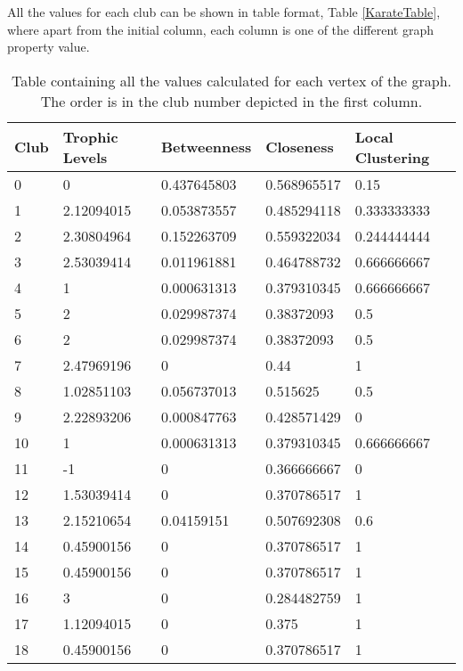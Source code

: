 All the values for each club can be shown in table format, Table \ref{KarateTable}, where apart from the initial column, each column is one of the different graph property value.

\begin{table}[H]
    \centering
    \small
    \caption{Table containing all the values calculated for each vertex of the graph. The order is in the club number depicted in the first column.}
    \begin{tabular}{|l|l|l|l|l|}
        \hline
        \textbf{Club} & \textbf{Trophic Levels} & \textbf{Betweenness} & \textbf{Closeness} & \textbf{Local Clustering} \\ \hline
        0 & 0 & 0.437645803 & 0.568965517 & 0.15 \\ \hline
        1 & 2.12094015 & 0.053873557 & 0.485294118 & 0.333333333 \\ \hline
        2 & 2.30804964 & 0.152263709 & 0.559322034 & 0.244444444 \\ \hline
        3 & 2.53039414 & 0.011961881 & 0.464788732 & 0.666666667 \\ \hline
        4 & 1 & 0.000631313 & 0.379310345 & 0.666666667 \\ \hline
        5 & 2 & 0.029987374 & 0.38372093 & 0.5 \\ \hline
        6 & 2 & 0.029987374 & 0.38372093 & 0.5 \\ \hline
        7 & 2.47969196 & 0 & 0.44 & 1 \\ \hline
        8 & 1.02851103 & 0.056737013 & 0.515625 & 0.5 \\ \hline
        9 & 2.22893206 & 0.000847763 & 0.428571429 & 0 \\ \hline
        10 & 1 & 0.000631313 & 0.379310345 & 0.666666667 \\ \hline
        11 & -1 & 0 & 0.366666667 & 0 \\ \hline
        12 & 1.53039414 & 0 & 0.370786517 & 1 \\ \hline
        13 & 2.15210654 & 0.04159151 & 0.507692308 & 0.6 \\ \hline
        14 & 0.45900156 & 0 & 0.370786517 & 1 \\ \hline
        15 & 0.45900156 & 0 & 0.370786517 & 1 \\ \hline
        16 & 3 & 0 & 0.284482759 & 1 \\ \hline
        17 & 1.12094015 & 0 & 0.375 & 1 \\ \hline
        18 & 0.45900156 & 0 & 0.370786517 & 1 \\ \hline

\end{tabular}
\end{table}
